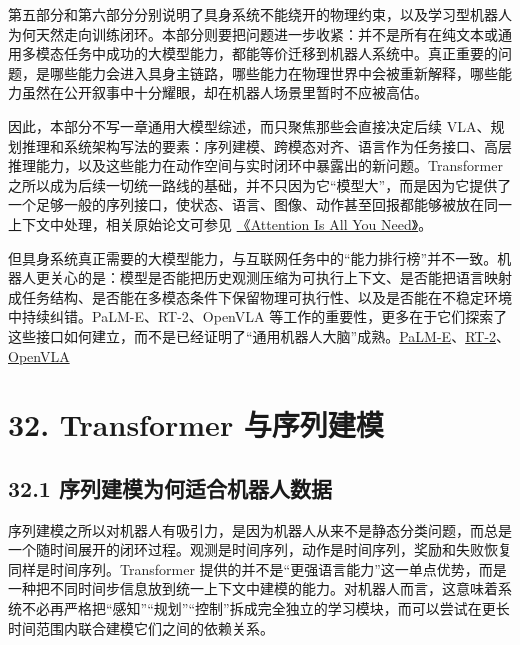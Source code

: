 

第五部分和第六部分分别说明了具身系统不能绕开的物理约束，以及学习型机器人为何天然走向训练闭环。本部分则要把问题进一步收紧：并不是所有在纯文本或通用多模态任务中成功的大模型能力，都能等价迁移到机器人系统中。真正重要的问题，是哪些能力会进入具身主链路，哪些能力在物理世界中会被重新解释，哪些能力虽然在公开叙事中十分耀眼，却在机器人场景里暂时不应被高估。

因此，本部分不写一章通用大模型综述，而只聚焦那些会直接决定后续 VLA、规划推理和系统架构写法的要素：序列建模、跨模态对齐、语言作为任务接口、高层推理能力，以及这些能力在动作空间与实时闭环中暴露出的新问题。Transformer 之所以成为后续一切统一路线的基础，并不只因为它“模型大”，而是因为它提供了一个足够一般的序列接口，使状态、语言、图像、动作甚至回报都能够被放在同一上下文中处理，相关原始论文可参见 \href{https://arxiv.org/abs/1706.03762}{《Attention Is All You Need》}。

但具身系统真正需要的大模型能力，与互联网任务中的“能力排行榜”并不一致。机器人更关心的是：模型是否能把历史观测压缩为可执行上下文、是否能把语言映射成任务结构、是否能在多模态条件下保留物理可执行性、以及是否能在不稳定环境中持续纠错。PaLM-E、RT-2、OpenVLA 等工作的重要性，更多在于它们探索了这些接口如何建立，而不是已经证明了“通用机器人大脑”成熟。\href{https://arxiv.org/abs/2303.03378}{PaLM-E}、\href{https://arxiv.org/abs/2307.15818}{RT-2}、\href{https://arxiv.org/abs/2406.09246}{OpenVLA}

\section*{32. Transformer 与序列建模}

\subsection*{32.1 序列建模为何适合机器人数据}


序列建模之所以对机器人有吸引力，是因为机器人从来不是静态分类问题，而总是一个随时间展开的闭环过程。观测是时间序列，动作是时间序列，奖励和失败恢复同样是时间序列。Transformer 提供的并不是“更强语言能力”这一单点优势，而是一种把不同时间步信息放到统一上下文中建模的能力。对机器人而言，这意味着系统不必再严格把“感知”“规划”“控制”拆成完全独立的学习模块，而可以尝试在更长时间范围内联合建模它们之间的依赖关系。

